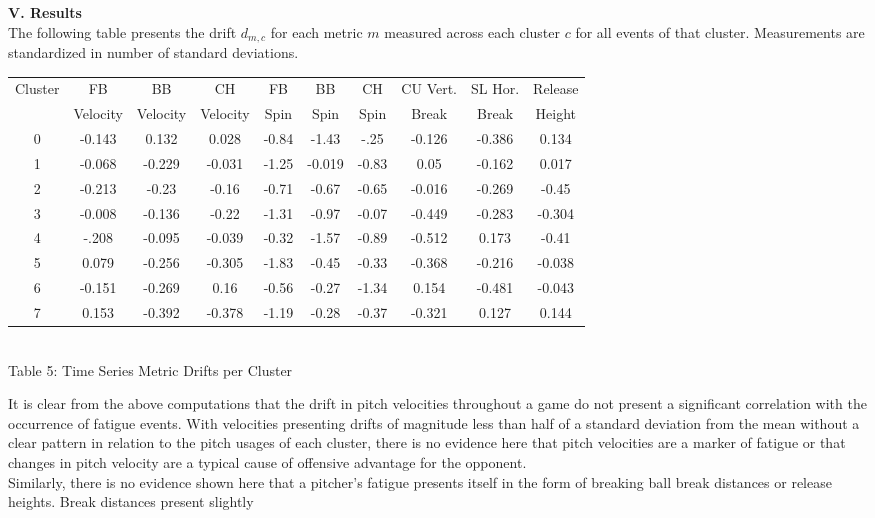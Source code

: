 \documentclass[12 pt]{article}
\begin{document}
\textbf{V. Results} \\
\indent The following table presents the drift $d_{m, c}$ for each metric $m$ measured across each cluster $c$ 
for all events of that cluster. Measurements are standardized in number of standard deviations.
\begin{center}
    \begin{tabular}{||c | c | c | c | c | c | c | c | c | c ||} 
     \hline
     Cluster & FB & BB & CH & FB & BB & CH & CU Vert.& SL Hor. & Release \\ [0.5ex]
     & Velocity & Velocity & Velocity & Spin & Spin & Spin & Break & Break & Height \\
     \hline
     0&-0.143&0.132&0.028&-0.84&-1.43&-.25&-0.126&-0.386&0.134 \\
     \hline
     1&-0.068&-0.229&-0.031&-1.25&-0.019&-0.83&0.05&-0.162&0.017 \\
     \hline
     2&-0.213&-0.23&-0.16&-0.71&-0.67&-0.65&-0.016&-0.269&-0.45 \\
     \hline
     3&-0.008&-0.136&-0.22&-1.31&-0.97&-0.07&-0.449&-0.283&-0.304 \\
     \hline
     4&-.208&-0.095&-0.039&-0.32&-1.57&-0.89&-0.512&0.173&-0.41 \\
     \hline
     5&0.079&-0.256&-0.305&-1.83&-0.45&-0.33&-0.368&-0.216&-0.038 \\
     \hline
     6&-0.151&-0.269&0.16&-0.56&-0.27&-1.34&0.154&-0.481&-0.043 \\
     \hline
     7&0.153&-0.392&-0.378&-1.19&-0.28&-0.37&-0.321&0.127&0.144 \\
     \hline
    \end{tabular}
    \newline \\ Table 5: Time Series Metric Drifts per Cluster
\end{center}
\indent It is clear from the above computations that the drift in pitch velocities 
throughout a game do not present a significant correlation with the occurrence of 
fatigue events. With velocities presenting drifts of magnitude less than half of 
a standard deviation from the mean without a clear pattern in relation to the pitch usages 
of each cluster, there is no evidence here that pitch velocities are a marker of fatigue 
or that changes in pitch velocity are a typical cause of offensive advantage for the 
opponent. 
\\ \indent Similarly, there is no evidence shown here that a pitcher's fatigue presents itself 
in the form of breaking ball break distances or release heights. Break distances present slightly 
\end{document}
